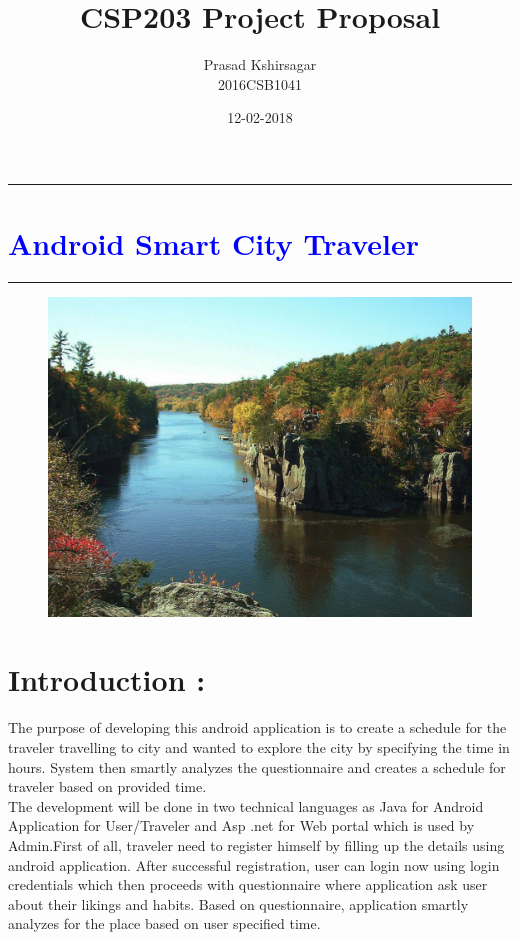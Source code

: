 \documentclass{article}
\title{\bf CSP203 Project Proposal}
\author{Prasad Kshirsagar\\
        2016CSB1041}
\date{12-02-2018}
\begin{document}
  \maketitle
  
 \begin{center}
\hrule width 1.0\textwidth
\end{center}
 \section*{\centering\bf\textcolor{blue} {Android Smart City Traveler}}
 \begin{center}
\hrule width 1.0\textwidth
\end{center}
  
  \begin{figure}[h!]
  \centering
  \includegraphics[width=\linewidth]{111.pdf}
  \end{figure}
  \newpage
  \tableofcontents

  \setcounter{page}{2}
  \hfill \break
  \hfill \break
  
  \section{Introduction :}
  The purpose of developing this android application is to create a schedule for the traveler travelling to city and wanted to explore the city by specifying the time in hours. System then smartly analyzes the questionnaire and creates a schedule for traveler based on provided time.\\ \hfill \break The development will be done in two technical languages as Java for Android Application for User/Traveler and Asp .net for Web portal which is used by Admin.First of all, traveler need to register himself by filling up the details using android application. After successful registration, user can login now using login credentials which then proceeds with questionnaire where application ask user about their likings and habits. Based on questionnaire, application smartly analyzes for the place based on user specified time.\\ 
  
\end{document}
